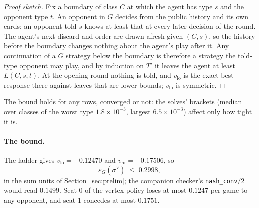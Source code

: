 \documentclass[11pt]{article}
\theoremstyle{plain}
\theoremstyle{definition}
\theoremstyle{remark}
\newcommand{\game}{\ensuremath{G}}
\newcommand{\epsG}{\ensuremath{\varepsilon_{\game}}}
\begin{document}
\begin{proof}[Proof sketch]
Fix a boundary of class $C$ at which the agent has type $s$ and the
opponent type $t$. An opponent in $\game$ decides from the public
history and its own cards; an opponent told $s$ knows at least that
at every later decision of the round. The agent's next discard and
order are drawn afresh given $(C,s)$, so the history before the
boundary changes nothing about the agent's play after it. Any
continuation of a $\game$ strategy below the boundary is therefore a
strategy the told-type opponent may play, and by induction on $T'$ it
leaves the agent at least $L(C,s,t)$. At the opening round nothing is
told, and $v_{\mathrm{lo}}$ is the exact best response there against
leaves that are lower bounds; $v_{\mathrm{hi}}$ is symmetric.
\end{proof}

The bound holds for any rows, converged or not: the solves' brackets
(median over classes of the worst type $1.8\times10^{-3}$, largest
$6.5\times10^{-3}$) affect only how tight it is.

\paragraph{The bound.} The ladder gives
$v_{\mathrm{lo}}=-0.12470$ and $v_{\mathrm{hi}}=+0.17506$, so
\[
\epsG(\sigma^{V}) \;\le\; 0.2998,
\]
in the sum units of Section~\ref{sec:prelim}; the companion checker's
\texttt{nash\_conv}$/2$ would read $0.1499$. Seat $0$ of the vertex
policy loses at most $0.1247$ per game to any opponent, and seat $1$
concedes at most $0.1751$.
\end{document}
